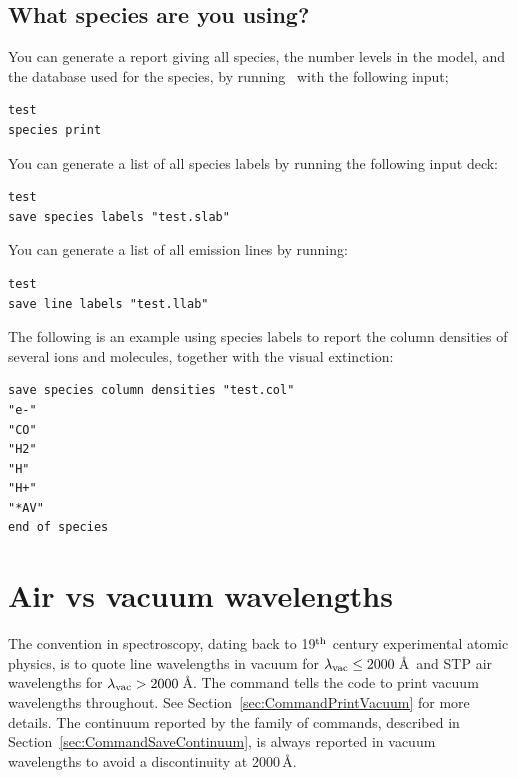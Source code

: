 \subsection{What species are you using?}

You can generate a report giving all species, the number levels in the model,
and the database used for the species,
by running \Cloudy\ with the following input;
\begin{verbatim}
test
species print
\end{verbatim}

You can generate a list of all species labels by running the following input deck:
\begin{verbatim}
test
save species labels "test.slab"
\end{verbatim}

You can generate a list of all emission lines by running:
\begin{verbatim}
test
save line labels "test.llab"
\end{verbatim}

The following is an example using species labels to report the column densities 
of several ions and molecules, together with the visual extinction:
\begin{verbatim}
save species column densities "test.col"
"e-"
"CO"
"H2"
"H"
"H+"
"*AV"
end of species
\end{verbatim}

\section{Air vs vacuum wavelengths}
\label{sec:AirVsVacuumWavelengths}
The convention in spectroscopy, dating back to 19$^{\rm th}$ century experimental atomic physics,
is to quote line wavelengths in vacuum for $\lambda_{\rm vac} \le 2000$\,\AA\ and STP air wavelengths
for $\lambda_{\rm vac} > 2000$\,\AA.
The  command
tells the code to print vacuum wavelengths throughout.
See Section~\ref{sec:CommandPrintVacuum} for more details.
The continuum reported by the family of  commands,
described in Section~\ref{sec:CommandSaveContinuum},
is always reported in vacuum wavelengths to avoid 
a discontinuity at 2000\,\AA.


